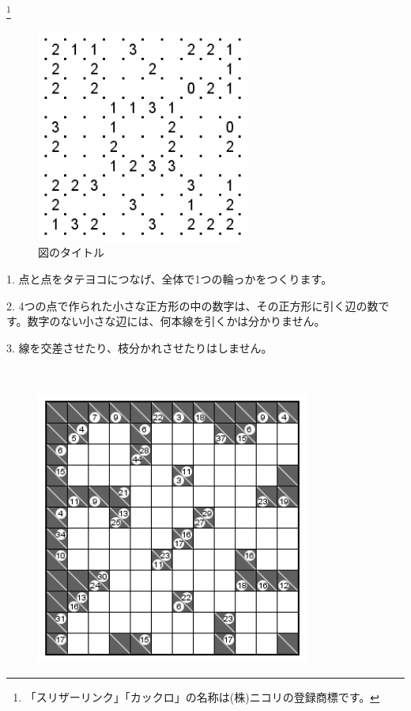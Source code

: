 \footnote{「スリザーリンク」「カックロ」の名称は(株)ニコリの登録商標です。}
\leavevmode \\
\begin{figure}[H]
\centering  %
\includegraphics[width =7cm,bb = 0 0 202 202]{sp1slitherlink1.png}
\caption{図のタイトル}    
\label{sample}
\end{figure}
\begin{description}
\item{1.} 点と点をタテヨコにつなげ、全体で1つの輪っかをつくります。
\item{2.}  4つの点で作られた小さな正方形の中の数字は、その正方形に引く辺の数です。数字のない小さな辺には、何本線を引くかは分かりません。
\item{3.} 線を交差させたり、枝分かれさせたりはしません。
\end{description}
\newpage
{}
\leavevmode \\
\begin{figure}[H]
\centering  %
\includegraphics[width = 9cm,bb = 0 0 240 240]{sp1kakkuro1.png}
\end{figure}

